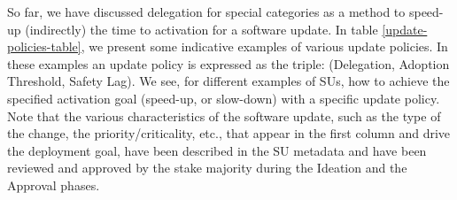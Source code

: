 So far, we have discussed delegation for special categories as a method to speed-up (indirectly) the time to activation for a software update. %
 In table \ref{update-policies-table}, we present some indicative examples of various update policies. In these examples an update policy is expressed as the triple: (Delegation, Adoption Threshold, Safety Lag). We see, for different examples of SUs, how to achieve the specified activation goal (speed-up, or slow-down) with a specific update policy. Note that the various characteristics of the software update, such as the type of the change, the priority/criticality, etc., that appear in the first column and drive the deployment goal, have been described in the SU metadata and have been reviewed and approved by the stake majority during the Ideation and the Approval phases.
 


